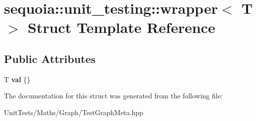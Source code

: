\hypertarget{structsequoia_1_1unit__testing_1_1wrapper}{}\section{sequoia\+::unit\+\_\+testing\+::wrapper$<$ T $>$ Struct Template Reference}
\label{structsequoia_1_1unit__testing_1_1wrapper}
\subsection*{Public Attributes}
\begin{DoxyCompactItemize}
\item 
\mbox{\label{structsequoia_1_1unit__testing_1_1wrapper_aa0a81b28998f790c17167e8e55f45fba}} 
T {\bfseries val} \{\}
\end{DoxyCompactItemize}


The documentation for this struct was generated from the following file\+:\begin{DoxyCompactItemize}
\item 
Unit\+Tests/\+Maths/\+Graph/Test\+Graph\+Meta.\+hpp\end{DoxyCompactItemize}
